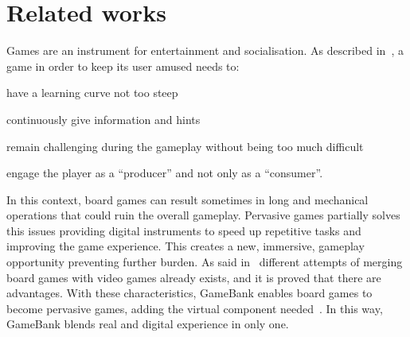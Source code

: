 \section{Related works}
\label{related_works}

Games are an instrument for entertainment and socialisation. As described 
in~\cite{gee03}, a game in order to keep its user amused needs to:
\begin{enumerate*}[label=\roman*)]
 \item have a learning curve not too steep
 \item continuously give information and hints
 \item remain challenging during the gameplay without being too much difficult
 \item engage the player as a ``producer'' and not only as a ``consumer''.
\end{enumerate*}
In this context, board games can result sometimes in long and mechanical 
operations that could ruin the overall gameplay. Pervasive games partially 
solves this issues providing digital instruments to speed up repetitive 
tasks and improving the game experience. This creates a new, immersive, 
gameplay opportunity preventing further burden.
As said in~\cite{mandryk02} different attempts of merging board games with video 
games already exists, and it is proved that there are advantages.
With these characteristics, GameBank enables board games to become pervasive 
games, adding the virtual component needed~\cite{arango17}. 
In this way, GameBank blends real and digital experience in only one.
